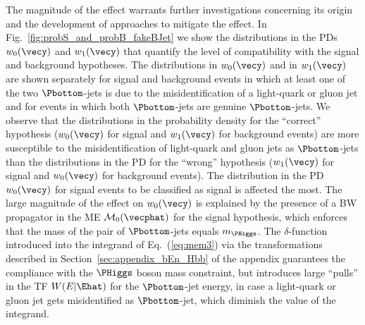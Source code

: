 The magnitude of the effect warrants further investigations concerning its origin and the development of approaches to mitigate the effect.
In Fig.~\ref{fig:probS_and_probB_fakeBJet} we show the distributions in the PDs $w_{0}(\vecy)$ and $w_{1}(\vecy)$
that quantify the level of compatibility with the signal and background hypotheses.
The distributions in $w_{0}(\vecy)$ and in $w_{1}(\vecy)$ are shown separately 
for signal and background events in which at least one of the two $\Pbottom$-jets is due to the misidentification of a light-quark or gluon jet
and for events in which both $\Pbottom$-jets are genuine $\Pbottom$-jets.
We observe that the distributions in the probability density for the ``correct'' hypothesis 
($w_{0}(\vecy)$ for signal and $w_{1}(\vecy)$ for background events)
are more susceptible to the misidentification of light-quark and gluon jets as $\Pbottom$-jets than the distributions in the PD for the ``wrong'' hypothesis 
($w_{1}(\vecy)$ for signal and $w_{0}(\vecy)$ for background events).
The distribution in the PD $w_{0}(\vecy)$ for signal events to be classified as signal is affected the most.
The large magnitude of the effect on $w_{0}(\vecy)$ is explained by the presence of a BW propagator in the ME $\mathcal{M}_{0}(\vecphat)$ for the signal hypothesis,
which enforces that the mass of the pair of $\Pbottom$-jets equals $m_{\PHiggs}$.
The $\delta$-function introduced into the integrand of Eq.~(\ref{eq:mem3}) via the transformations described in Section~\ref{sec:appendix_bEn_Hbb} of the appendix
guarantees the compliance with the $\PHiggs$ boson mass constraint,
but introduces large ``pulls'' in the TF $W(E|\Ehat)$ for the $\Pbottom$-jet energy,
in case a light-quark or gluon jet gets misidentified as $\Pbottom$-jet,
which diminish the value of the integrand.

